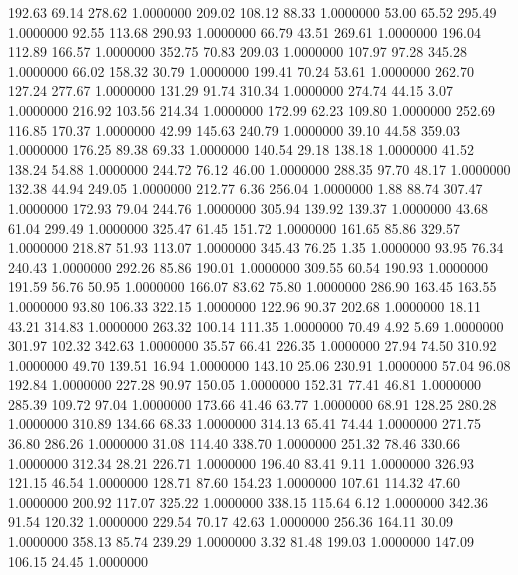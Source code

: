  192.63   69.14  278.62   1.0000000
 209.02  108.12   88.33   1.0000000
  53.00   65.52  295.49   1.0000000
  92.55  113.68  290.93   1.0000000
  66.79   43.51  269.61   1.0000000
 196.04  112.89  166.57   1.0000000
 352.75   70.83  209.03   1.0000000
 107.97   97.28  345.28   1.0000000
  66.02  158.32   30.79   1.0000000
 199.41   70.24   53.61   1.0000000
 262.70  127.24  277.67   1.0000000
 131.29   91.74  310.34   1.0000000
 274.74   44.15    3.07   1.0000000
 216.92  103.56  214.34   1.0000000
 172.99   62.23  109.80   1.0000000
 252.69  116.85  170.37   1.0000000
  42.99  145.63  240.79   1.0000000
  39.10   44.58  359.03   1.0000000
 176.25   89.38   69.33   1.0000000
 140.54   29.18  138.18   1.0000000
  41.52  138.24   54.88   1.0000000
 244.72   76.12   46.00   1.0000000
 288.35   97.70   48.17   1.0000000
 132.38   44.94  249.05   1.0000000
 212.77    6.36  256.04   1.0000000
   1.88   88.74  307.47   1.0000000
 172.93   79.04  244.76   1.0000000
 305.94  139.92  139.37   1.0000000
  43.68   61.04  299.49   1.0000000
 325.47   61.45  151.72   1.0000000
 161.65   85.86  329.57   1.0000000
 218.87   51.93  113.07   1.0000000
 345.43   76.25    1.35   1.0000000
  93.95   76.34  240.43   1.0000000
 292.26   85.86  190.01   1.0000000
 309.55   60.54  190.93   1.0000000
 191.59   56.76   50.95   1.0000000
 166.07   83.62   75.80   1.0000000
 286.90  163.45  163.55   1.0000000
  93.80  106.33  322.15   1.0000000
 122.96   90.37  202.68   1.0000000
  18.11   43.21  314.83   1.0000000
 263.32  100.14  111.35   1.0000000
  70.49    4.92    5.69   1.0000000
 301.97  102.32  342.63   1.0000000
  35.57   66.41  226.35   1.0000000
  27.94   74.50  310.92   1.0000000
  49.70  139.51   16.94   1.0000000
 143.10   25.06  230.91   1.0000000
  57.04   96.08  192.84   1.0000000
 227.28   90.97  150.05   1.0000000
 152.31   77.41   46.81   1.0000000
 285.39  109.72   97.04   1.0000000
 173.66   41.46   63.77   1.0000000
  68.91  128.25  280.28   1.0000000
 310.89  134.66   68.33   1.0000000
 314.13   65.41   74.44   1.0000000
 271.75   36.80  286.26   1.0000000
  31.08  114.40  338.70   1.0000000
 251.32   78.46  330.66   1.0000000
 312.34   28.21  226.71   1.0000000
 196.40   83.41    9.11   1.0000000
 326.93  121.15   46.54   1.0000000
 128.71   87.60  154.23   1.0000000
 107.61  114.32   47.60   1.0000000
 200.92  117.07  325.22   1.0000000
 338.15  115.64    6.12   1.0000000
 342.36   91.54  120.32   1.0000000
 229.54   70.17   42.63   1.0000000
 256.36  164.11   30.09   1.0000000
 358.13   85.74  239.29   1.0000000
   3.32   81.48  199.03   1.0000000
 147.09  106.15   24.45   1.0000000
